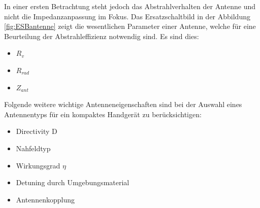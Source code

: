 In einer ersten Betrachtung steht jedoch das Abstrahlverhalten der Antenne und nicht die Impedanzanpassung im Fokus. Das Ersatzschaltbild in der Abbildung \ref{fig:ESBantenne} zeigt die wesentlichen Parameter einer Antenne, welche für eine Beurteilung der Abstrahleffizienz notwendig sind. Es sind dies:
\begin{itemize}
\item $R_{v}$
\item $R_{rad}$
\item $Z_{ant}$
\end{itemize}
Folgende weitere wichtige Antenneneigenschaften sind bei der Auswahl eines Antennentyps für ein kompaktes Handgerät zu berücksichtigen:
\begin{itemize}
\item Directivity D
\item Nahfeldtyp
\item Wirkungsgrad $\eta$
\item Detuning durch Umgebungsmaterial
\item Antennenkopplung
\end{itemize}


